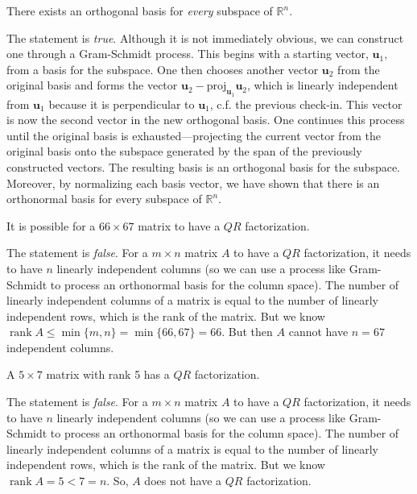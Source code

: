 \documentclass[11pt,letterpaper]{article}
\DeclareMathOperator{\rank}{rank}
\begin{document}
 There exists an orthogonal basis for \textit{every} subspace of $\mathbb{R}^n$. \pspace

\sol The statement is \textit{true}. Although it is not immediately obvious, we can construct one through a Gram-Schmidt process. This begins with a starting vector, $\mathbf{u}_1$, from a basis for the subspace. One then chooses another vector $\mathbf{u}_2$ from the original basis and forms the vector $\mathbf{u}_2 - \text{proj}_{\mathbf{u}_1} \mathbf{u}_2$, which is linearly independent from $\mathbf{u}_1$ because it is perpendicular to $\mathbf{u}_1$, c.f. the previous check-in. This vector is now the second vector in the new orthogonal basis. One continues this process until the original basis is exhausted---projecting the current vector from the original basis onto the subspace generated by the span of the previously constructed vectors. The resulting basis is an orthogonal basis for the subspace. Moreover, by normalizing each basis vector, we have shown that there is an orthonormal basis for every subspace of $\mathbb{R}^n$. \par\vspace{1.3cm}



 It is possible for a $66 \times 67$ matrix to have a $QR$ factorization. \pspace

\sol The statement is \textit{false}. For a $m \times n$ matrix $A$ to have a $QR$ factorization, it needs to have $n$ linearly independent columns (so we can use a process like Gram-Schmidt to process an orthonormal basis for the column space). The number of linearly independent columns of a matrix is equal to the number of linearly independent rows, which is the rank of the matrix. But we know $\rank A \leq \min \{ m, n \}= \min \{ 66, 67 \}= 66$. But then $A$ cannot have $n= 67$ independent columns. \par\vspace{1.3cm}



 A $5 \times 7$ matrix with rank 5 has a $QR$ factorization. \par\vspace{0.3cm}

\sol The statement is \textit{false}. For a $m \times n$ matrix $A$ to have a $QR$ factorization, it needs to have $n$ linearly independent columns (so we can use a process like Gram-Schmidt to process an orthonormal basis for the column space). The number of linearly independent columns of a matrix is equal to the number of linearly independent rows, which is the rank of the matrix. But we know $\rank A= 5 < 7= n$. So, $A$ does not have a $QR$ factorization. \par\vspace{1.3cm}
\end{document}
